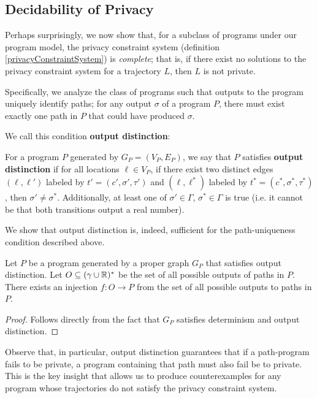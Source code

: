 \subsection{Decidability of Privacy}

Perhaps surprisingly, we now show that, for a subclass of programs under our program model, the privacy constraint system (definition \ref{privacyConstraintSystem}) is \textit{complete}; that is, if there exist no solutions to the privacy constraint system for a trajectory $L$, then $L$ is not private. 

Specifically, we analyze the class of programs such that outputs to the program uniquely identify paths; for any output $\sigma$ of a program $P$, there must exist exactly one path in $P$ that could have produced $\sigma$. 

We call this condition \textbf{output distinction}:

\begin{defn}\label{outputDistinctionDef}
    For a program $P$ generated by $G_P = (V_P, E_P)$, we say that $P$ satisfies \textbf{output distinction} if for all locations $\ell\in V_P$, if there exist two distinct edges $(\ell, \ell')$ labeled by $t'=(c', \sigma', \tau')$ and $(\ell, \ell^*)$ labeled by $t^* = (c^*, \sigma^*, \tau^*)$, then $\sigma' \neq \sigma^*$. Additionally, at least one of $\sigma'\in \Gamma$, $\sigma^*\in \Gamma$ is true (i.e. it cannot be that both transitions output a real number).
\end{defn}

We show that output distinction is, indeed, sufficient for the path-uniqueness condition described above.

\begin{prop}
    Let $P$ be a program generated by a proper graph $G_P$ that satisfies output distinction. Let $O\subseteq (\gamma\cup \mathbb{R})^*$ be the set of all possible outputs of paths in $P$. There exists an injection $f: O\to P$ from the set of all possible outputs to paths in $P$. 
\end{prop}
\begin{proof}
    Follows directly from the fact that $G_P$ satisfies determinism and output distinction. 
\end{proof}

Observe that, in particular, output distinction guarantees that if a path-program fails to be private, a program containing that path must also fail be to private. This is the key insight that allows us to produce counterexamples for any program whose trajectories do not satisfy the privacy constraint system. 


